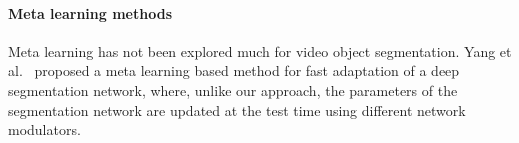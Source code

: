 \documentclass[10pt,twocolumn,letterpaper]{article}
\begin{document}
\paragraph{Meta learning methods}
Meta learning has not been explored much for video object segmentation.
Yang et al.~\cite{Yang_2018_CVPR} proposed a meta learning based method for fast adaptation of a deep segmentation network, where, unlike our approach, the parameters of the segmentation network are updated at the test time using different network modulators. 
\end{document}
